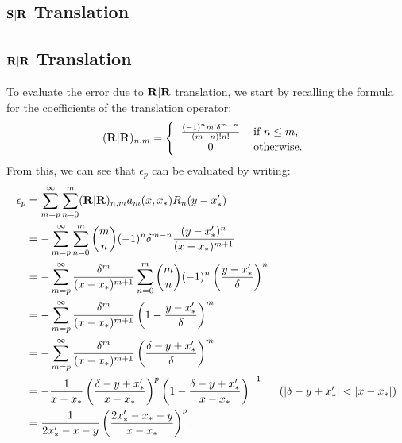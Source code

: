 \subsection{$\bold{S}|\bold{R}$ Translation}


\subsection{$\bold{R}|\bold{R}$ Translation}

To evaluate the error due to $\bold{R}|\bold{R}$ translation, we start by
recalling the formula for the coefficients of the translation
operator:
\begin{align*}
  (\RRmat)_{n,m} = \left\{ \begin{tabular}{cl}
                             $\frac{(-1)^n m! \delta^{m-n}}{(m-n)! n!}$ & if $n \leq m$, \\
                             0 & otherwise.
                           \end{tabular} \right.
\end{align*}
From this, we can see that $\epsilon_p$ can be evaluated by writing:
\begin{align*}
  \epsilon_p
  &= \sum_{m=p}^\infty \sum_{n=0}^m (\bold{R}|\bold{R})_{n, m} a_m(x, x_*) R_n(y - x_*') \\
  &= -\sum_{m=p}^\infty \sum_{n=0}^m {m \choose n} (-1)^n \delta^{m-n} \frac{(y - x_*')^n}{(x-x_*)^{m+1}} \\
  &= -\sum_{m=p}^\infty \frac{\delta^m}{(x-x_*)^{m+1}} \sum_{n=0}^m {m \choose n} (-1)^n \left(\frac{y - x_*'}{\delta}\right)^n \\
  &= -\sum_{m=p}^\infty \frac{\delta^m}{(x-x_*)^{m+1}} \left(1 - \frac{y - x_*'}{\delta}\right)^m \\
  &= -\sum_{m=p}^\infty \frac{\delta^m}{(x-x_*)^{m+1}} \left(\frac{\delta - y + x_*'}{\delta}\right)^m \\
  &= -\frac{1}{x-x_*} \left(\frac{\delta - y + x_*'}{x-x_*}\right)^p \left(1 - \frac{\delta - y + x_*'}{x - x_*}\right)^{-1} & \mbox{($|\delta - y + x_*'| < |x - x_*|$)} \\
  &= \frac{1}{2x_*' - x - y} \left(\frac{2x_*' - x_* - y}{x - x_*}\right)^p.
\end{align*}


